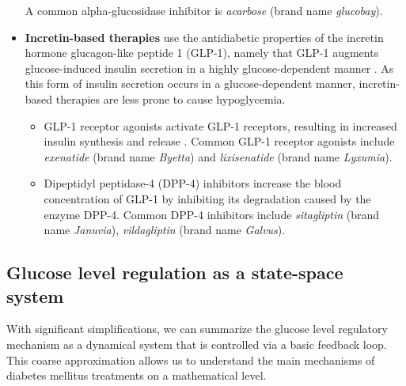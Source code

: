 \begin{itemize}
A common alpha-glucosidase inhibitor is \emph{acarbose} (brand name \emph{glucobay}). \\
\item \textbf{Incretin-based therapies} use the antidiabetic properties of the incretin hormone glucagon-like peptide 1 (GLP-1), namely that GLP-1 augments glucose-induced insulin secretion in a highly glucose-dependent manner \citep{nauck2009incretin,lovshin2009incretin}. As this form of insulin secretion occurs in a glucose-dependent manner, incretin-based therapies are less prone to cause hypoglycemia.
\begin{itemize}
        \item GLP-1 receptor agonists activate GLP-1 receptors, resulting in increased insulin synthesis and release \citep{drucker1987glucagon}. Common GLP-1 receptor agonists include \emph{exenatide} (brand name \emph{Byetta}) and \emph{lixisenatide} (brand name \emph{Lyxumia}). \\
        \item Dipeptidyl peptidase-4 (DPP-4) inhibitors increase the blood concentration of GLP-1 by inhibiting its degradation caused by the enzyme DPP-4. Common DPP-4 inhibitors include \emph{sitagliptin} (brand name \emph{Januvia}), \emph{vildagliptin} (brand name \emph{Galvus}).  \\
\end{itemize}
\end{itemize} 





\ifx
\subsection{Glucose level regulation as a state-space system}
With significant simplifications, we can summarize the glucose level regulatory mechanism as a dynamical system that is controlled via a basic feedback loop. This coarse approximation allows us to understand the main mechanisms of diabetes mellitus treatments on a mathematical level.

